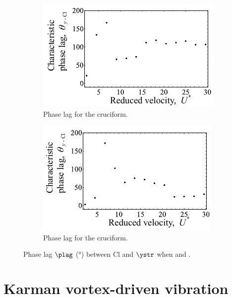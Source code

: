 \documentclass[a4paper,fleqn]{cas-sc}
\begin{document}
\begin{figure}
  \centering
  \begin{subfigure}[h]{0.4\textwidth}
    \includegraphics[width=\textwidth]{figs/phaseLag4}
    \caption{Phase lag for the \angfo{} cruciform.}
    \label{fig:phaseLag675deg}
  \end{subfigure}
  \hspace{6mm}
  \begin{subfigure}[h]{0.4\textwidth}
    \includegraphics[width=\textwidth]{figs/phaseLag3}
    \caption{Phase lag for the \angth{} cruciform.}
    \label{fig:phaseLag45deg}
  \end{subfigure}

  \caption{Phase lag $\plag$ (\si{\degree}) between Cl and $\ystr$ when \angfo{} and \angth{}.}
  \label{fig:phaseLag67545deg}
\end{figure}

\section{Karman vortex-driven vibration}\label{sec:kvivRegime}
\end{document}
